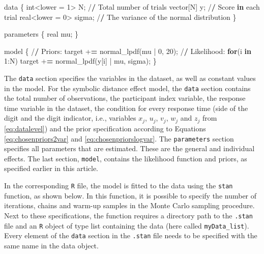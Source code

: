 \documentclass[
  english,
  doc,floatsintext]{apa6}
\newenvironment{Shaded}{\begin{snugshade}}{\end{snugshade}}
\newcommand{\ControlFlowTok}[1]{\textcolor[rgb]{0.13,0.29,0.53}{\textbf{#1}}}
\newcommand{\DecValTok}[1]{\textcolor[rgb]{0.00,0.00,0.81}{#1}}
\newcommand{\ErrorTok}[1]{\textcolor[rgb]{0.64,0.00,0.00}{\textbf{#1}}}
\newcommand{\FunctionTok}[1]{\textcolor[rgb]{0.00,0.00,0.00}{#1}}
\newcommand{\NormalTok}[1]{#1}
\newcommand{\OtherTok}[1]{\textcolor[rgb]{0.56,0.35,0.01}{#1}}
\newcommand{\SpecialCharTok}[1]{\textcolor[rgb]{0.00,0.00,0.00}{#1}}
\begin{document}
\scriptsize

\begin{Shaded}
\begin{Highlighting}[]
\NormalTok{data \{}
\NormalTok{  int}\SpecialCharTok{\textless{}}\NormalTok{lower }\OtherTok{=} \DecValTok{1}\SpecialCharTok{\textgreater{}}\NormalTok{ N;             }\SpecialCharTok{/}\ErrorTok{/}\NormalTok{ Total number of trials }
\NormalTok{  vector[N] y;                  }\SpecialCharTok{/}\ErrorTok{/}\NormalTok{ Score }\ControlFlowTok{in}\NormalTok{ each trial }
\NormalTok{  real}\SpecialCharTok{\textless{}}\NormalTok{lower }\OtherTok{=} \DecValTok{0}\SpecialCharTok{\textgreater{}}\NormalTok{ sigma;        }\SpecialCharTok{/}\ErrorTok{/}\NormalTok{ The variance of the normal distribution }
\NormalTok{\}}

\NormalTok{parameters \{}
\NormalTok{  real mu; }
\NormalTok{\}}

\NormalTok{model \{}
  \SpecialCharTok{/}\ErrorTok{/}\NormalTok{ Priors}\SpecialCharTok{:} 
\NormalTok{  target }\SpecialCharTok{+}\ErrorTok{=} \FunctionTok{normal\_lpdf}\NormalTok{(mu }\SpecialCharTok{|} \DecValTok{0}\NormalTok{, }\DecValTok{20}\NormalTok{);}
  \SpecialCharTok{/}\ErrorTok{/}\NormalTok{ Likelihood}\SpecialCharTok{:} 
  \ControlFlowTok{for}\NormalTok{(i }\ControlFlowTok{in} \DecValTok{1}\SpecialCharTok{:}\NormalTok{N)}
\NormalTok{    target }\SpecialCharTok{+}\ErrorTok{=} \FunctionTok{normal\_lpdf}\NormalTok{(y[i] }\SpecialCharTok{|}\NormalTok{ mu, sigma);}
\NormalTok{\}}
\end{Highlighting}
\end{Shaded}

\normalsize

The \texttt{data} section specifies the variables in the dataset, as well as constant values in the model. For the symbolic distance effect model, the \texttt{data} section contains the total number of observations, the participant index variable, the response time variable in the dataset, the condition for every response time (side of the digit and the digit indicator, i.e., variables \(x_j\), \(u_j\), \(v_j\), \(w_j\) and \(z_j\) from \eqref{eq:datalevel}) and the prior specification according to Equations \eqref{eq:chosenpriors2var} and \eqref{eq:chosenpriorslogvar}. The \texttt{parameters} section specifies all parameters that are estimated. These are the general and individual effects. The last section, \texttt{model}, contains the likelihood function and priors, as specified earlier in this article.

In the corresponding \texttt{R} file, the model is fitted to the data using the \texttt{stan} function, as shown below. In this function, it is possible to specify the number of iterations, chains and warm-up samples in the Monte Carlo sampling procedure. Next to these specifications, the function requires a directory path to the \texttt{.stan} file and an \texttt{R} object of type list containing the data (here called \texttt{myData\_list}). Every element of the \texttt{data} section in the \texttt{.stan} file needs to be specified with the same name in the data object.
~
\end{document}
